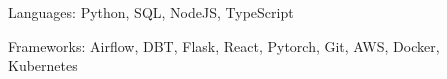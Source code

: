 


\begin{cvskills}


\cvskill
{Languages:} %
{Python, SQL, NodeJS, TypeScript} %


\cvskill
{Frameworks:} %
{Airflow, DBT, Flask, React, Pytorch, Git, AWS, Docker, Kubernetes}


\end{cvskills}